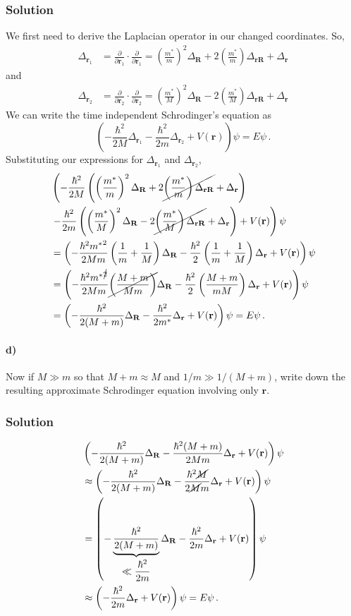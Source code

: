 \documentclass[letterpaper,10pt]{article}
\def\R{\mathbf{R}}
\def\r{\mathbf{r}}
\begin{document}
\subsubsection*{Solution}
We first need to derive the Laplacian operator in our changed coordinates. So,
\begin{align*}
\Delta_{\r_1}&=\frac{\partial}{\partial\r_1}\cdot\frac{\partial}{\partial\r_1}
=\left(\frac{m^*}{m}\right)^2\Delta_\R+2\left(\frac{m^*}{m}\right)\Delta_{\r\R}
+\Delta_\r
\end{align*}
and
\begin{align*}
\Delta_{\r_2}&=\frac{\partial}{\partial\r_2}\cdot\frac{\partial}{\partial\r_2}
=\left(\frac{m^*}{M}\right)^2\Delta_\R-2\left(\frac{m^*}{M}\right)\Delta_{\r\R}
+\Delta_\r
\end{align*}
We can write the time independent Schrodinger's equation as
\[
\left(-\frac{\hbar^2}{2M}\Delta_{\r_1}-\frac{\hbar^2}{2m}\Delta_{\r_2}
+V(\r)\right)\psi=E\psi\,.
\]
Substituting our expressions for $\Delta_{\r_1}$ and $\Delta_{\r_2}$,
\begin{align*}
&\left(-\frac{\hbar^2}{2M}\left(
\left(\frac{m^*}{m}\right)^2\Delta_\R
+2\cancel{\left(\frac{m^*}{m}\right)\Delta_{\r\R}}
+\Delta_\r\right)\right.\\
&\left.-\frac{\hbar^2}{2m}\left(
\left(\frac{m^*}{M}\right)^2\Delta_\R
-2\cancel{\left(\frac{m^*}{M}\right)\Delta_{\r\R}}
+\Delta_\r\right)
+V(\r)\right)\psi\\
&=\left(-\frac{\hbar^2{m^*}^2}{2Mm}\left(\frac{1}{m}+\frac{1}{M}\right)\Delta_\R
-\frac{\hbar^2}{2}\left(\frac{1}{m}+\frac{1}{M}\right)\Delta_\r
+V(\r)\right)\psi\\
&=\left(-\frac{\hbar^2{m^*}^{\cancel{2}}}{2Mm}
\cancel{\left(\frac{M+m}{Mm}\right)}
\Delta_\R-\frac{\hbar^2}{2}\left(\frac{M+m}{mM}\right)\Delta_\r
+V(\r)\right)\psi\\
&=\left(-\frac{\hbar^2}{2(M+m)}\Delta_\R-\frac{\hbar^2}{2m^*}\Delta_\r
+V(\r)\right)\psi=E\psi\,.
\end{align*}
\paragraph*{d)} Now if $M\gg m$ so that $M+m\approx M$ and $1/m\gg 1/(M+m)$,
write down the resulting approximate Schrodinger equation involving only $\r$.
\subsubsection*{Solution}
\begin{align*}
&\left(-\frac{\hbar^2}{2(M+m)}\Delta_\R-\frac{\hbar^2(M+m)}{2Mm}\Delta_\r
+V(\r)\right)\psi\\
&\approx \left(-\frac{\hbar^2}{2(M+m)}\Delta_\R
-\frac{\hbar^2\cancel{M}}{2\cancel{M}m}\Delta_\r
+V(\r)\right)\psi\\
&=\left(-\underbrace{\frac{\hbar^2}{2(M+m)}}_
{\displaystyle\ll \frac{\hbar^2}{2m}}
\Delta_\R
-\frac{\hbar^2}{2m}\Delta_\r
+V(\r)\right)\psi\\
&\approx\left(-\frac{\hbar^2}{2m}\Delta_\r
+V(\r)\right)\psi=E\psi\,.
\end{align*}
\end{document}
